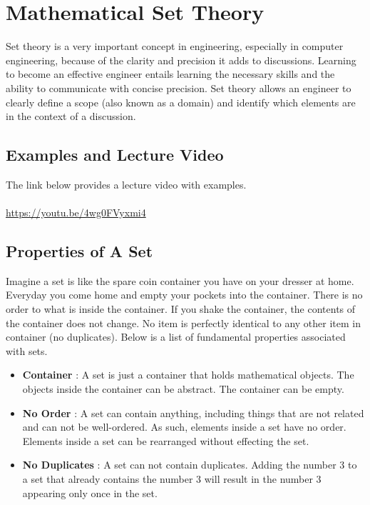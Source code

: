 \section*{Mathematical Set Theory}

Set theory is a very important concept in engineering, especially in computer engineering, because of the clarity and precision it adds to discussions.  Learning to become an effective engineer entails learning the necessary skills and the ability to communicate with concise precision.  Set theory allows an engineer to clearly define a scope (also known as a domain) and identify which elements are in the context of a discussion. 

\subsection*{Examples and Lecture Video}
The link below provides a lecture video with examples.\\\\
\url{https://youtu.be/4wg0FVyxmi4}

\subsection*{Properties of A Set}
Imagine a set is like the spare coin container you have on your dresser at home.  Everyday you come home and empty your pockets into the container.  There is no order to what is inside the container. If you shake the container, the contents of the container does not change. No item is perfectly identical to any other item in container (no duplicates).   Below is a list of fundamental properties associated with sets.
\begin{itemize}
    \item \textbf{Container } : A set is just a container that holds mathematical objects. The objects inside the container can be abstract.  The container can be empty.
    \item \textbf{No Order} : A set can contain anything, including things that are not related and can not be well-ordered.  As such, elements inside a set have no order.  Elements inside a set can be rearranged without effecting the set.
    \item \textbf{No Duplicates} : A set can not contain duplicates.  Adding the number 3 to a set that already contains the number 3 will result in the number 3 appearing only once in the set.
\end{itemize}


